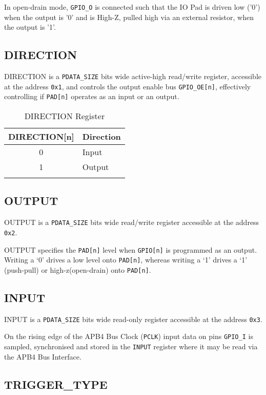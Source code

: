 In open-drain mode, \texttt{GPIO\_O} is connected such that the IO Pad is driven low ('0') when the output is '0' and is High-Z, pulled high via an external resistor, when the output is '1'.

\subsection{DIRECTION}\label{direction}

DIRECTION is a \texttt{PDATA\_SIZE} bits wide active-high read/write register, accessible at the address \texttt{0x1}, and controls the output enable bus \texttt{GPIO\_OE[n]}, effectively controlling if \texttt{PAD[n]} operates as an input or an output.

\begin{longtable}[]{@{}cl@{}}
\toprule
\textbf{DIRECTION[n]} & \textbf{Direction}\tabularnewline
\midrule
\endhead
0 & Input\tabularnewline
1 & Output\tabularnewline
\bottomrule
\caption{DIRECTION Register}
\end{longtable}

\subsection{OUTPUT}\label{output}

OUTPUT is a \texttt{PDATA\_SIZE} bits wide read/write register accessible at the address \texttt{0x2}.

OUTPUT specifies the \texttt{PAD[n]} level when \texttt{GPIO[n]} is programmed as an output. Writing a ‘0’ drives a low level onto \texttt{PAD[n]}, whereas writing a ‘1’ drives a ‘1’ (push-pull) or high-z(open-drain) onto \texttt{PAD[n]}.

\subsection{INPUT}\label{input}

INPUT is a \texttt{PDATA\_SIZE} bits wide read-only register accessible at the address \texttt{0x3}.

On the rising edge of the APB4 Bus Clock (\texttt{PCLK}) input data on pins
\texttt{GPIO\_I} is sampled, synchronised and stored in the \texttt{INPUT} register where it may be read via the APB4 Bus Interface.

\subsection{TRIGGER\_TYPE}\label{triggertype}

